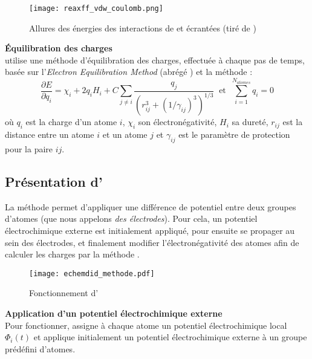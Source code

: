 \begin{figure}[h!]
    \centering
    \texttt{[image: reaxff\_vdw\_coulomb.png]}
    \caption{Allures des énergies des interactions de \vdw{} et \coulomb{} écrantées {\tiny (tiré de \cite{russo_atomistic-scale_2011})}}
    \label{fig:reaxff_vdw_coulomb}
\end{figure}

\textbf{Équilibration des charges}\\
\reaxff{} utilise une méthode d'équilibration des charges, effectuée à chaque pas de temps, basée sur l'\emph{Electron Equilibration Method} (abrégé \eem{})\cite{mortier_electronegativity-equalization_2002} et la méthode \qeq{}\cite{rappe_charge_1991} :
\begin{equation}
    \boxed%
    {
    \frac{\partial E}{\partial q_i} = \chi_i + 2 q_i H_i + C \sum_{j \neq i} \frac{q_j}{\left(r_{ij}^3 + (1 / \gamma_{ij})^3\right)^{1/3}}
    }
    \ \text{ et } \ 
    \boxed%
    {
        \sum_{i = 1}^{N_{atomes}} q_i = 0
    }
\end{equation}
où $q_i$ est la charge d'un atome $i$, $\chi_i$ son électronégativité, $H_i$ sa dureté, $r_{ij}$ est la distance entre un atome $i$ et un atome $j$ et $\gamma_{ij}$ est le paramètre de protection pour la paire $ij$.


    \subsection{Présentation d'\echemdid{}} \label{sec:echemdid}

La méthode \echemdid{} permet d'appliquer une différence de potentiel entre deux groupes d'atomes (que nous appelons \emph{des électrodes}). Pour cela, un potentiel électrochimique externe est initialement appliqué, pour ensuite se propager au sein des électrodes, et finalement modifier l'électronégativité des atomes afin de calculer les charges par la méthode \qeq{}.
    
\begin{figure}[h!]
    \centering
    \texttt{[image: echemdid\_methode.pdf]}
    \caption{Fonctionnement d'\echemdid{}}
    \label{fig:echemdid_fonctionnement}
\end{figure}

\textbf{Application d'un potentiel électrochimique externe}\\
Pour fonctionner, \echemdid{} assigne à chaque atome un potentiel électrochimique local $\Phi_i (t)$ et applique initialement un potentiel électrochimique externe à un groupe prédéfini d'atomes.

